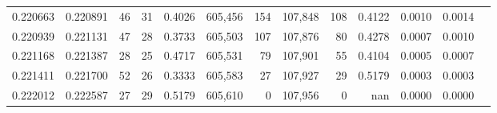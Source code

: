 \begin{tabular}{rrrrrrrrrrrrr}
0.220663 & 0.220891 &    46 &  31 &                                     0.4026 & 605,456 &     154 & 107,848 &     108 & 0.4122 & 0.0010 & 0.0014 \\
0.220939 & 0.221131 &    47 &  28 &                                     0.3733 & 605,503 &     107 & 107,876 &      80 & 0.4278 & 0.0007 & 0.0010 \\
0.221168 & 0.221387 &    28 &  25 &                                     0.4717 & 605,531 &      79 & 107,901 &      55 & 0.4104 & 0.0005 & 0.0007 \\
0.221411 & 0.221700 &    52 &  26 &                                     0.3333 & 605,583 &      27 & 107,927 &      29 & 0.5179 & 0.0003 & 0.0003 \\
0.222012 & 0.222587 &    27 &  29 &                                     0.5179 & 605,610 &       0 & 107,956 &       0 &    nan & 0.0000 & 0.0000 \\
\bottomrule
\end{tabular}
